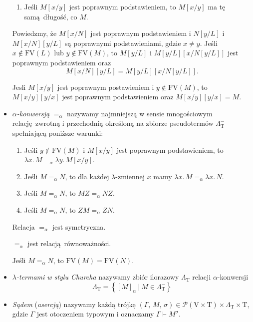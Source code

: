 \begin{definicja}
\begin{itemize}
\begin{fakt}
\begin{enumerate}[label=({\alph*})]
        \item Jeśli \(M[x/y]\) jest poprawnym podstawieniem, to \(M[x/y]\) ma tę samą długość, co \(M\).
      \end{enumerate}
    \end{fakt}
    \begin{fakt}
      Powiedzmy, że \(M[x/N]\) jest poprawnym podstawieniem i \(N[y/L]\) i \(M[x/N][y/L]\) są poprawnymi podstawieniami, gdzie
      \(x\neq y\). Jeśli \(x\not\in \mathrm{FV}(L)\) lub \(y\not\in\mathrm{FV}(M)\), to \(M[y/L]\) i \( M[y/L]\left[x/N[y/L]\right] \) jest poprawnym podstawieniem oraz
      \[
        M[x/N][y/L]=M[y/L][x/N[y/L]].
      \]
    \end{fakt}

    \begin{fakt}
      Jesli \(M[x/y]\) jest poprawnym postawieniem i \(y\not\in\mathrm{FV}(M)\), to \(M[x/y][y/x]\) jest poprawnym podstawieniem oraz
      \(M[x/y][y/x]=M\).
    \end{fakt}

  \item \emph{\(\alpha\)-konwersją} \(=_\alpha\) nazywamy najmniejszą w sensie mnogościowym relację zwrotną i przechodnią określoną na zbiorze pseudotermów \(\Lambda^{-}_{\mathrm{T}}\) spełniającą poniższe warunki:
    \begin{enumerate}[label=({\alph*})]
      \item Jeśli \(y\not\in \mathrm{FV}(M)\) i \(M[x/y]\) jest poprawnym podstawieniem, to \(\lambda x.\, M  =_\alpha \lambda y.\, M[x/y]\).
      \item Jeśli \(M=_\alpha N\), to dla każdej \(\lambda\)-zmiennej \(x\) mamy \(\lambda x.\, M =_\alpha \lambda x.\,N\).
      \item Jeśli \(M=_\alpha N\), to \(M Z=_\alpha N Z\).
      \item Jeśli \(M=_\alpha N\), to \(ZM =_\alpha ZN\).
    \end{enumerate}
    \begin{fakt}
      Relacja \(=_{\alpha}\) jest symetryczna.
    \end{fakt}
    \begin{fakt}
      \(=_{\alpha}\) jest relacją równoważności.
    \end{fakt}
    \begin{fakt}
      Jeśli \(M=_\alpha N\), to \(\mathrm{FV}(M)=\mathrm{FV}(N)\).
    \end{fakt}
  \item \emph{\(\lambda\)-termami w stylu Churcha} nazywamy zbiór ilorazowy \(\Lambda_\mathrm{T}\) relacji \(\alpha\)-konwersji
  \[
    \Lambda_{\mathrm{T}}=\left\{[M]_\alpha\:|\: M\in\Lambda^{-}_\mathrm{T}\right\}
  \]
\item
    \emph{Sądem} (\emph{asercją}) nazywamy każdą trójkę \((\Gamma ,\,M,\,\sigma )\in\mathcal{P}(\mathrm{V}\times \mathrm{T})\times\Lambda_{\mathrm{T}}\times\mathrm{T}\), gdzie \(\Gamma\) jest otoczeniem typowym i oznaczamy \(\Gamma\vdash M^{\sigma}\).


\end{itemize}
\end{definicja}
